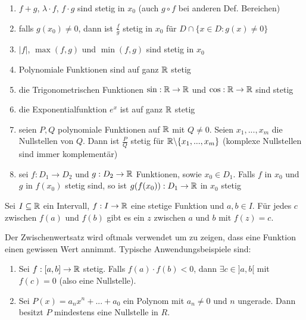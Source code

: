 \begin{enumerate}[label=(\arabic*)]
    \item $f + g$, $\lambda \cdot f$, $f \cdot g$ sind stetig in $x_0$ (auch $g \circ f$ bei anderen Def. Bereichen)
    \item falls $g(x_0) \neq 0$, dann ist $\frac{f}{g}$ stetig in $x_0$ für $D \cap \{ x \in D : g(x) \neq 0 \}$
    \item $|f|$, $\max(f,g)$ und $\min(f,g)$ sind stetig in $x_0$
    \item Polynomiale Funktionen sind auf ganz $\mathbb{R}$ stetig
    \item die Trigonometrischen Funktionen $\sin : \mathbb{R} \to \mathbb{R}$ und $\cos : \mathbb{R} \to \mathbb{R}$ sind stetig
    \item die Exponentialfunktion $e^x$ ist auf ganz $\mathbb{R}$ stetig
    \item seien $P, Q$ polynomiale Funktionen auf $\mathbb{R}$ mit $Q \neq 0$. Seien $x_1, ... , x_m$ die
    Nullstellen von $Q$. Dann ist $\frac{P}{Q}$ stetig für $\mathbb{R} \backslash \{x_1, ... , x_m\}$ 
    (komplexe Nullstellen sind immer komplementär)
    \item sei $f : D_1 \to D_2$ und $g : D_2 \to \mathbb{R}$ Funktionen, sowie $x_0 \in D_1$. Falls $f$ in $x_0$
    und $g$ in $f(x_0)$ stetig sind, so ist $g(f(x_0)) : D_1 \to \mathbb{R}$ in $x_0$ stetig
\end{enumerate}



\begin{tcolorbox}
    \Satz Sei $I \subseteq \mathbb{R}$ ein Intervall, $f : I \to \mathbb{R}$ eine stetige Funktion und $a,b \in I$.
    Für jedes $c$ zwischen $f(a)$ und $f(b)$ gibt es ein $z$ zwischen $a$ und $b$ mit $f(z) = c$.
\end{tcolorbox}

Der Zwischenwertsatz wird oftmals verwendet um zu zeigen, dass eine Funktion einen gewissen Wert annimmt.
Typische Anwendungsbeispiele sind:
\begin{enumerate}[label=(\arabic*)]
    \item Sei $f : [a,b] \to \mathbb{R}$ stetig. Falls $f(a) \cdot f(b) < 0$, dann $\exists c \in ]a,b[$ mit
    $f(c) = 0$ (also eine Nullstelle).
    \item Sei $P(x) = a_nx^n + ... + a_0$ ein Polynom mit $a_n \neq 0$ und $n$ ungerade. Dann besitzt
    $P$ mindestens eine Nullstelle in $R$.
\end{enumerate}



